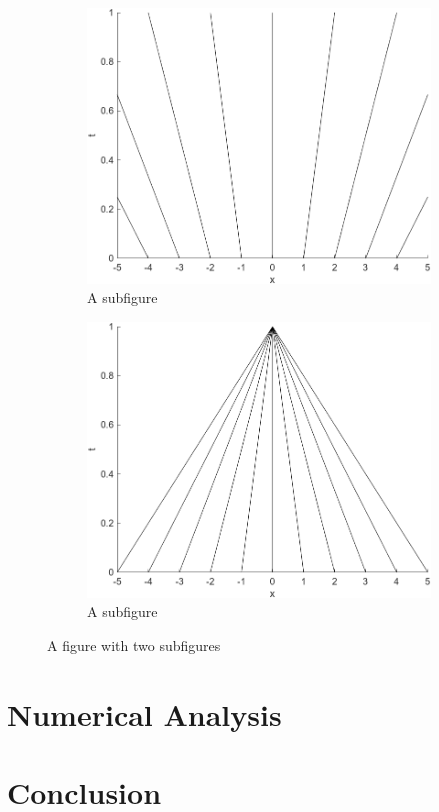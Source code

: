 \documentclass{myproject}
\begin{document}
\begin{figure}
    \centering
    \begin{subfigure}{.5\textwidth}
        \centering
        \includegraphics[width=0.9\linewidth]{intro_f1.png}
        \caption{A subfigure}
        \label{fig:sub1}
    \end{subfigure}%
    \begin{subfigure}{.5\textwidth}
        \centering
        \includegraphics[width=0.9\linewidth]{intro_f2.png}
        \caption{A subfigure}
        \label{fig:sub2}
    \end{subfigure}
    \caption{A figure with two subfigures}
    \label{fig:test}
\end{figure}



\section{Numerical Analysis}

\section{Conclusion}

\nocite{choksi2022}
\nocite{kutz2013}
\printbibliography
\end{document}
